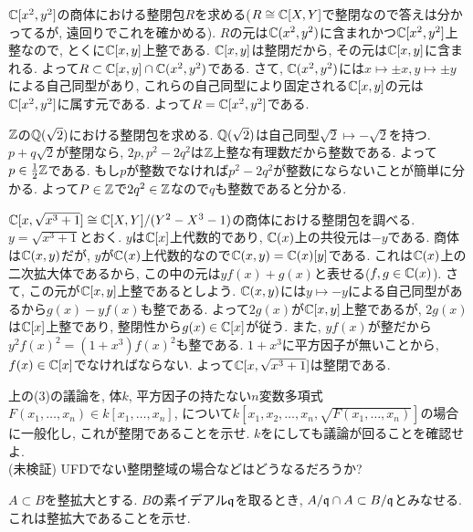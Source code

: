 \begin{eg}
\ben
\item $\mathbb{C}[x^2,y^2]$の商体における整閉包$R$を求める($R\cong \mathbb{C}[X,Y]$で整閉なので答えは分かってるが, 遠回りでこれを確かめる).  $R$の元は$\mathbb{C}(x^2,y^2)$に含まれかつ$\mathbb{C}[x^2,y^2]$上整なので, とくに$\mathbb{C}[x,y]$上整である. $\mathbb{C}[x,y]$は整閉だから,  その元は$\mathbb{C}[x,y]$に含まれる. よって$R\subset \mathbb{C}[x,y]\cap \mathbb{C}(x^2,y^2)$である. さて, $\mathbb{C}(x^2,y^2)$には$x\mapsto \pm x, y\mapsto \pm y$による自己同型があり, これらの自己同型により固定される$\mathbb{C}[x,y]$の元は$\mathbb{C}[x^2,y^2]$に属す元である. よって$R=\mathbb{C}[x^2,y^2]$である.
\item $\mathbb{Z}$の$\mathbb{Q}(\sqrt{2})$における整閉包を求める. $\mathbb{Q}(\sqrt{2})$は自己同型$\sqrt{2}\mapsto -\sqrt{2}$を持つ. $p+q\sqrt{2}$が整閉なら, $2p, p^2-2q^2$は$\mathbb{Z}$上整な有理数だから整数である. よって$p\in \frac{1}{2}\mathbb{Z}$である. もし$p$が整数でなければ$p^2-2q^2$が整数にならないことが簡単に分かる. よって$P\in \mathbb{Z}$で$2q^2\in \mathbb{Z}$なので$q$も整数であると分かる.
\item $\mathbb{C}[x, \sqrt{x^3 + 1}] \cong \mathbb{C}[X,Y]/(Y^2 - X^3 - 1)$の商体における整閉包を調べる. $y=\sqrt{x^3+1}$とおく. $y$は$\mathbb{C}[x]$上代数的であり, $\mathbb{C}(x)$上の共役元は$-y$である. 商体は$\mathbb{C}(x,y)$だが, $y$が$\mathbb{C}(x)$上代数的なので$\mathbb{C}(x,y) = \mathbb{C}(x)[y]$である. これは$\mathbb{C}(x)$上の二次拡大体であるから, この中の元は$yf(x) + g(x)$と表せる($f,g\in \mathbb{C}(x)$). さて, この元が$\mathbb{C}[x,y]$上整であるとしよう. $\mathbb{C}(x,y)$には$y\mapsto -y$による自己同型があるから$g(x)-yf(x)$も整である. よって$2g(x)$が$\mathbb{C}[x,y]$上整であるが,  $2g(x)$は$\mathbb{C}[x]$上整であり, 整閉性から$g(x) \in \mathbb{C}[x]$が従う. また, $yf(x)$が整だから$y^2f(x)^2 = (1+x^3)f(x)^2$も整である. $1+x^3$に平方因子が無いことから, $f(x)\in \mathbb{C}[x]$でなければならない. よって$\mathbb{C}[x,\sqrt{x^3+1}]$は整閉である.
\een
\end{eg}
\begin{prac}
上の(3)の議論を, 体$k$, 平方因子の持たない$n$変数多項式$F(x_1,\dots, x_n)\in k[x_1,\dots, x_n]$, について$k[x_1,x_2,\dots, x_n, \sqrt{F(x_1,\dots, x_n)}]$の場合に一般化し, これが整閉であることを示せ. $k$をにしても議論が回ることを確認せよ. \\
(未検証) UFDでない整閉整域の場合などはどうなるだろうか?
\end{prac}


\begin{prac}
$A\subset B$を整拡大とする. $B$の素イデアル$\mathfrak{q}$を取るとき, $A/\mathfrak{q}\cap A \subset B/\mathfrak{q}$とみなせる. これは整拡大であることを示せ.
\end{prac}

